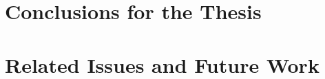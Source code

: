 \section{Conclusions for the Thesis}
\label{conclusions:thesis}


\section{Related Issues and Future Work}
\label{conclusions:future}

